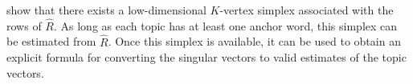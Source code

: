 \documentclass[preprint,11pt]{article}
\numberwithin{equation}{section}
\newcommand{\diag}{\mathrm{diag}}
\begin{document}
%
%
\cite{ke2024using} show that there exists a low-dimensional $K$-vertex simplex associated with the rows of $\widehat{R}$. As long as each topic has at least one anchor word, this simplex can be estimated from $\widehat{R}$. Once this simplex is available, it can be used to obtain an explicit formula for converting the singular vectors to valid estimates of the topic vectors. 
%
\end{document}
